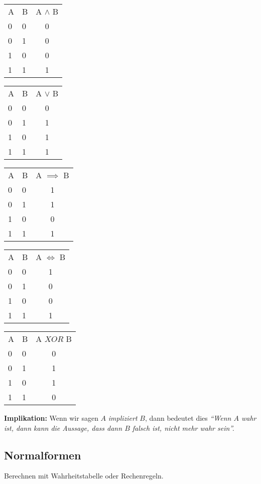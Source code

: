 \documentclass[8pt,landscape]{scrartcl}
\begin{document}
\begin{multicols}{3}
\begin{tabular}{ll||c}
A & B & A $\land$ B  \\ \cline{1-3}
0 & 0 &           0  \\
0 & 1 &           0  \\
1 & 0 &           0  \\
1 & 1 &           1
\end{tabular}
\begin{tabular}{ll||c}
A & B & A $\lor$ B  \\ \cline{1-3}
0 & 0 &           0  \\
0 & 1 &           1  \\
1 & 0 &           1  \\
1 & 1 &           1
\end{tabular}
\begin{tabular}{ll||c}
A & B & A $\implies$ B  \\ \cline{1-3}
0 & 0 &           1  \\
0 & 1 &           1  \\
1 & 0 &           0  \\
1 & 1 &           1
\end{tabular}

\begin{tabular}{ll||c}
A & B & A $\iff$ B  \\ \cline{1-3}
0 & 0 &           1  \\
0 & 1 &           0  \\
1 & 0 &           0  \\
1 & 1 &           1
\end{tabular}
\begin{tabular}{ll||c}
A & B & A $XOR$ B  \\ \cline{1-3}
0 & 0 &           0  \\
0 & 1 &           1  \\
1 & 0 &           1  \\
1 & 1 &           0
\end{tabular}

\textbf{Implikation:} Wenn wir sagen $A$ \textit{impliziert} $B$, dann bedeutet dies \textit{``Wenn $A$ wahr ist, dann kann die Aussage, dass dann $B$ falsch ist, nicht mehr wahr sein''.}



\subsection{Normalformen}
Berechnen mit Wahrheitstabelle oder Rechenregeln.\\


\end{multicols}
\end{document}
